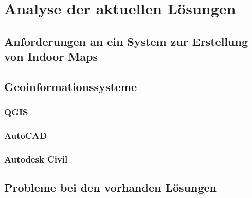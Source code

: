 \chapter{Analyse der aktuellen Lösungen}
\label{ch:analysis}

\section{Anforderungen an ein System zur Erstellung von Indoor Maps}

\section{Geoinformationssysteme}
\subsection{QGIS}
\subsection{AutoCAD}
\subsection{Autodesk Civil}

\section{Probleme bei den vorhanden Lösungen}
